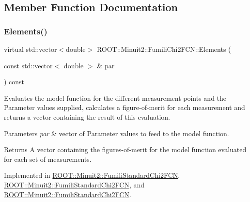 \subsection{Member Function Documentation}
\mbox{\label{classROOT_1_1Minuit2_1_1FumiliChi2FCN_a25cc8dcc2eff831b3c0a94bf5413c2cd}} 
\subsubsection{\texorpdfstring{Elements()}{Elements()}\hspace{0.1cm}{\footnotesize\ttfamily [1/3]}}
{\footnotesize\ttfamily virtual std\+::vector$<$double$>$ R\+O\+O\+T\+::\+Minuit2\+::\+Fumili\+Chi2\+F\+C\+N\+::\+Elements (\begin{DoxyParamCaption}\item[{const std\+::vector$<$ double $>$ \&}]{par }\end{DoxyParamCaption}) const\hspace{0.3cm}{\ttfamily [pure virtual]}}

Evaluates the model function for the different measurement points and the Parameter values supplied, calculates a figure-\/of-\/merit for each measurement and returns a vector containing the result of this evaluation.


\begin{DoxyParams}{Parameters}
{\em par} & vector of Parameter values to feed to the model function.\\
\hline
\end{DoxyParams}
\begin{DoxyReturn}{Returns}
A vector containing the figures-\/of-\/merit for the model function evaluated for each set of measurements. 
\end{DoxyReturn}


Implemented in \mbox{\hyperlink{classROOT_1_1Minuit2_1_1FumiliStandardChi2FCN_ae7683cdbfa4160902add963d2132ab76}{R\+O\+O\+T\+::\+Minuit2\+::\+Fumili\+Standard\+Chi2\+F\+CN}}, \mbox{\hyperlink{classROOT_1_1Minuit2_1_1FumiliStandardChi2FCN_ab05d3fe2dcb9b1c56b6753debe5e0064}{R\+O\+O\+T\+::\+Minuit2\+::\+Fumili\+Standard\+Chi2\+F\+CN}}, and \mbox{\hyperlink{classROOT_1_1Minuit2_1_1FumiliStandardChi2FCN_ab05d3fe2dcb9b1c56b6753debe5e0064}{R\+O\+O\+T\+::\+Minuit2\+::\+Fumili\+Standard\+Chi2\+F\+CN}}.

